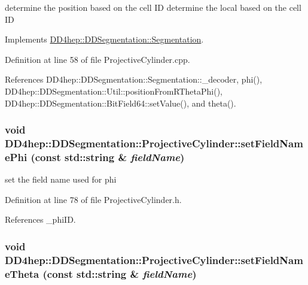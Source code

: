 determine the position based on the cell ID determine the local based on the cell ID 

Implements \hyperlink{class_d_d4hep_1_1_d_d_segmentation_1_1_segmentation_a594fe6d78667415855858d083b64acad}{DD4hep::DDSegmentation::Segmentation}.

Definition at line 58 of file ProjectiveCylinder.cpp.

References DD4hep::DDSegmentation::Segmentation::\_\-decoder, phi(), DD4hep::DDSegmentation::Util::positionFromRThetaPhi(), DD4hep::DDSegmentation::BitField64::setValue(), and theta().\hypertarget{class_d_d4hep_1_1_d_d_segmentation_1_1_projective_cylinder_ad43fb9ac8d2eb280bdeb465f46f49c28}{
\subsubsection[{setFieldNamePhi}]{\setlength{\rightskip}{0pt plus 5cm}void DD4hep::DDSegmentation::ProjectiveCylinder::setFieldNamePhi (const std::string \& {\em fieldName})}}
\label{class_d_d4hep_1_1_d_d_segmentation_1_1_projective_cylinder_ad43fb9ac8d2eb280bdeb465f46f49c28}


set the field name used for phi 

Definition at line 78 of file ProjectiveCylinder.h.

References \_\-phiID.\hypertarget{class_d_d4hep_1_1_d_d_segmentation_1_1_projective_cylinder_a90249eda202e3bd1fb2c5d8c193549af}{
\subsubsection[{setFieldNameTheta}]{\setlength{\rightskip}{0pt plus 5cm}void DD4hep::DDSegmentation::ProjectiveCylinder::setFieldNameTheta (const std::string \& {\em fieldName})}}
\label{class_d_d4hep_1_1_d_d_segmentation_1_1_projective_cylinder_a90249eda202e3bd1fb2c5d8c193549af}


